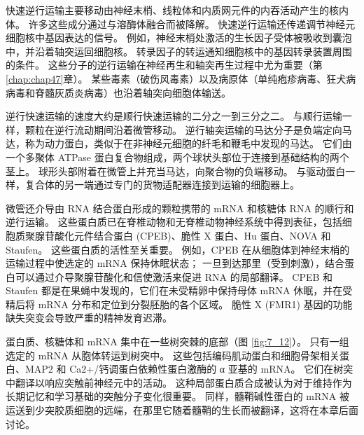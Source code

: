 快速逆行运输主要移动由神经末梢、线粒体和内质网元件的内吞活动产生的核内体。 
许多这些成分通过与溶酶体融合而被降解。 
快速逆行运输还传递调节神经元细胞核中基因表达的信号。 
例如，神经末梢处激活的生长因子受体被吸收到囊泡中，并沿着轴突运回细胞核。 
转录因子的转运通知细胞核中的基因转录装置周围的条件。 
这些分子的逆行运输在神经再生和轴突再生过程中尤为重要（第 \ref{chap:chap47}章）。 
某些毒素（破伤风毒素）以及病原体（单纯疱疹病毒、狂犬病病毒和脊髓灰质炎病毒）也沿着轴突向细胞体输送。


逆行快速运输的速度大约是顺行快速运输的二分之一到三分之二。 
与顺行运输一样，颗粒在逆行流动期间沿着微管移动。 
逆行轴突运输的马达分子是负端定向马达，称为动力蛋白，类似于在非神经元细胞的纤毛和鞭毛中发现的马达。 它们由一个多聚体 ATPase 蛋白复合物组成，两个球状头部位于连接到基础结构的两个茎上。 
球形头部附着在微管上并充当马达，向聚合物的负端移动。 
与驱动蛋白一样，复合体的另一端通过专门的货物适配器连接到运输的细胞器上。


微管还介导由 RNA 结合蛋白形成的颗粒携带的 mRNA 和核糖体 RNA 的顺行和逆行运输。 
这些蛋白质已在脊椎动物和无脊椎动物神经系统中得到表征，包括细胞质聚腺苷酸化元件结合蛋白 (CPEB)、脆性 X 蛋白、Hu 蛋白、NOVA 和 Staufen。 这些蛋白质的活性至关重要。 
例如，CPEB 在从细胞体到神经末梢的运输过程中使选定的 mRNA 保持休眠状态； 一旦到达那里（受到刺激），结合蛋白可以通过介导聚腺苷酸化和信使激活来促进 RNA 的局部翻译。 
CPEB 和 Staufen 都是在果蝇中发现的，它们在未受精卵中保持母体 mRNA 休眠，并在受精后将 mRNA 分布和定位到分裂胚胎的各个区域。 
脆性 X (FMR1) 基因的功能缺失突变会导致严重的精神发育迟滞。


蛋白质、核糖体和 mRNA 集中在一些树突棘的底部（图 \ref{fig:7_12}）。 
只有一组选定的 mRNA 从胞体转运到树突中。 
这些包括编码肌动蛋白和细胞骨架相关蛋白、MAP2 和 Ca2+/钙调蛋白依赖性蛋白激酶的 α 亚基的 mRNA。 
它们在树突中翻译以响应突触前神经元中的活动。 
这种局部蛋白质合成被认为对于维持作为长期记忆和学习基础的突触分子变化很重要。 
同样，髓鞘碱性蛋白的 mRNA 被运送到少突胶质细胞的远端，在那里它随着髓鞘的生长而被翻译，这将在本章后面讨论。

